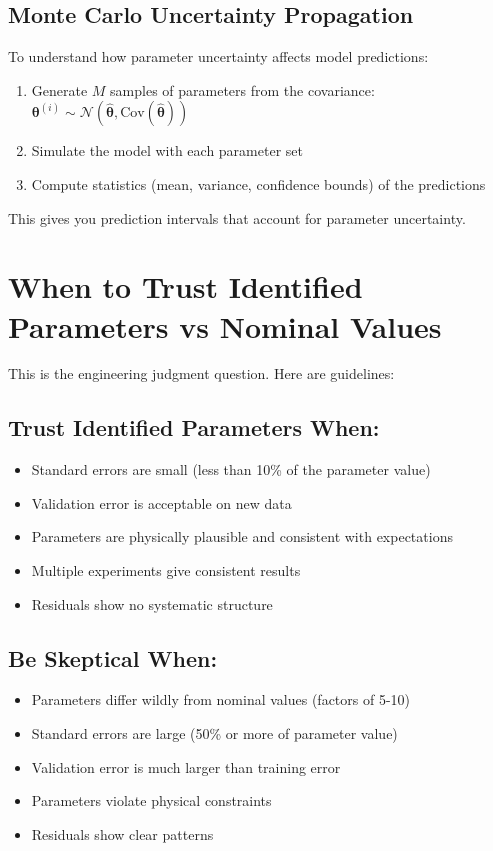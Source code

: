 \subsection{Monte Carlo Uncertainty Propagation}

To understand how parameter uncertainty affects model predictions:
\begin{enumerate}
    \item Generate $M$ samples of parameters from the covariance: $\boldsymbol{\theta}^{(i)} \sim \mathcal{N}(\hat{\boldsymbol{\theta}}, \text{Cov}(\hat{\boldsymbol{\theta}}))$
    \item Simulate the model with each parameter set
    \item Compute statistics (mean, variance, confidence bounds) of the predictions
\end{enumerate}

This gives you prediction intervals that account for parameter uncertainty.

\section{When to Trust Identified Parameters vs Nominal Values}

This is the engineering judgment question. Here are guidelines:

\subsection{Trust Identified Parameters When:}
\begin{itemize}
    \item Standard errors are small (less than 10\% of the parameter value)
    \item Validation error is acceptable on new data
    \item Parameters are physically plausible and consistent with expectations
    \item Multiple experiments give consistent results
    \item Residuals show no systematic structure
\end{itemize}

\subsection{Be Skeptical When:}
\begin{itemize}
    \item Parameters differ wildly from nominal values (factors of 5-10)
    \item Standard errors are large (50\% or more of parameter value)
    \item Validation error is much larger than training error
    \item Parameters violate physical constraints
    \item Residuals show clear patterns
\end{itemize}

